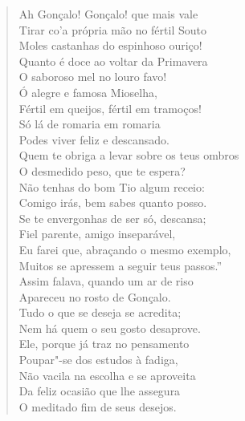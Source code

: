 \begin{verse}
Ah Gonçalo! Gonçalo! que mais vale\\
Tirar co'a própria mão no fértil Souto\\
Moles castanhas do espinhoso ouriço!\\
Quanto é doce ao voltar da Primavera\\
O saboroso mel no louro favo!\\
Ó alegre e famosa Mioselha,\\
Fértil em queijos, fértil em tramoços!\\
Só lá de romaria em romaria\\
Podes viver feliz e descansado.\\ %
Quem te obriga a levar sobre os teus ombros\\
O desmedido peso, que te espera?\\
Não tenhas do bom Tio algum receio:\\
Comigo irás, bem sabes quanto posso.\\
Se te envergonhas de ser só, descansa;\\
Fiel parente, amigo inseparável,\\
Eu farei que, abraçando o mesmo exemplo,\\
Muitos se apressem a seguir teus passos.'' \\[10pt]


Assim falava, quando um ar de riso\\
Apareceu no rosto de Gonçalo.\\
Tudo o que se deseja se acredita;\\
Nem há quem o seu gosto desaprove.\\
Ele, porque já traz no pensamento\\
Poupar"-se dos estudos à fadiga,\\
Não vacila na escolha e se aproveita\\
Da feliz ocasião que lhe assegura\\
O meditado fim de seus desejos. \\[10pt]



\end{verse}
